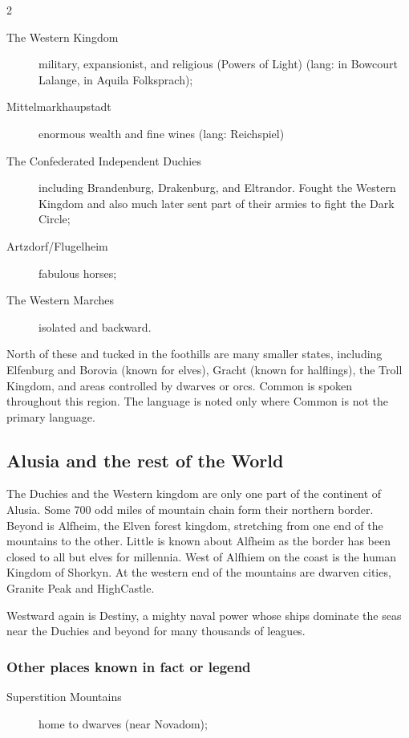 \begin{multicols}{2}
\begin{description}
\item[The Western Kingdom] military, expansionist,
and religious (Powers of Light) (lang: in
Bowcourt Lalange, in Aquila Folksprach);

\item[Mittelmarkhaupstadt] enormous wealth and fine wines (lang:
  Reichspiel)
  
\item[The Confederated Independent Duchies] including Brandenburg,
  Drakenburg, and Eltrandor. Fought the Western Kingdom and also much
  later sent part of their armies to fight the Dark Circle;

\item[Artzdorf/Flugelheim] fabulous horses;

\item[The Western Marches] isolated and backward.

\end{description}

North of these and tucked in the foothills are many smaller states,
including Elfenburg and Borovia (known for elves), Gracht (known for
halflings), the Troll Kingdom, and areas controlled by dwarves or
orcs. Common is spoken throughout this region. The language is noted
only where Common is not the primary language.

\subsection{Alusia and the rest of the World}

The Duchies and the Western kingdom are only one part of the continent
of Alusia. Some 700 odd miles of mountain chain form their northern
border. Beyond is Alfheim, the Elven forest kingdom, stretching from
one end of the mountains to the other. Little is known about Alfheim
as the border has been closed to all but elves for millennia. West of
Alfhiem on the coast is the human Kingdom of Shorkyn. At the western
end of the mountains are dwarven cities, Granite Peak and HighCastle.

Westward again is Destiny, a mighty naval power whose ships dominate
the seas near the Duchies and beyond for many thousands of leagues.

\subsubsection{Other places known in fact or legend}

\begin{description}
\item[Superstition Mountains] home to dwarves
(near Novadom);


\end{description}
\end{multicols}
